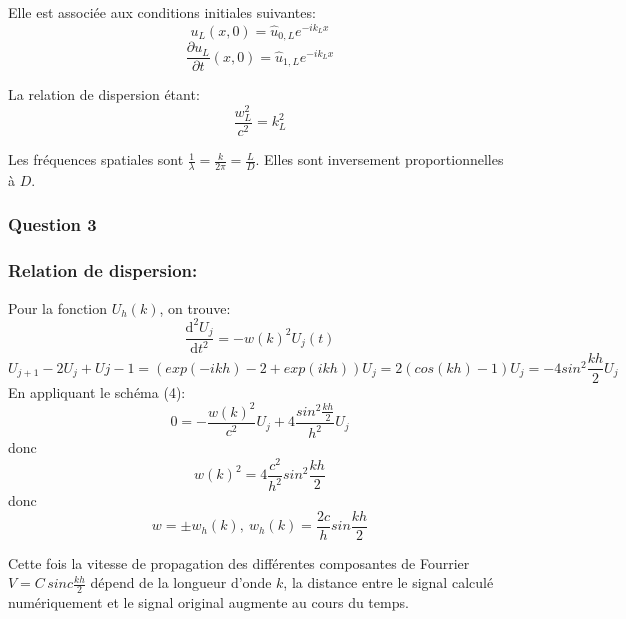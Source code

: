 \documentclass{article}
\newcommand{\Q}[1]{\subsubsection*{Question #1}}
\newcommand\Coord[2]{\ensuremath{\begin{pmatrix}
 #1 \\
 #2 
\end{pmatrix}}}
\begin{document}

 Elle est associée aux conditions initiales suivantes:
$$ u_L(x, 0) = \hat{u}_{0,L} e^{-i k_L x} $$
$$ \frac{ \partial u_L }{ \partial t }(x, 0) = \hat{u}_{1,L} e^{-i k_L x} $$

La relation de dispersion étant:
$$\frac{w_L^2}{c^2}= k_L^2$$

Les fréquences spatiales sont $ \frac{1}{ \lambda } = \frac{k}{2 \pi } = \frac{L}{D}$. Elles sont inversement proportionnelles à $D$.

\Q{3}
\subsubsection*{Relation de dispersion:} 

Pour la fonction $U_h(k)$, on trouve:
$$ \frac{\mathrm{d}^2 U_j} {\mathrm{d}t^2} = -w(k)^2 U_j(t) $$
$$ U_{j+1} - 2U_j + U{j-1} = (exp(-ikh)  - 2 + exp(ikh)) U_j = 2(cos(kh)-1) U_j = -4sin^2 \frac{kh}{2} U_j $$
En appliquant le schéma (4): 
$$ 0 = -\frac{w(k)^2}{c^2} U_j + 4\frac{sin^2 \frac{kh}{2} }{h^2} U_j$$
donc 
$$ w(k)^2 = 4\frac{c^2}{h^2}sin^2 \frac{kh}{2} $$
donc
$$ w = \pm w_h(k), \ w_h(k) = \frac{2c}{h}sin \frac{kh}{2}$$

Cette fois la vitesse de propagation des différentes composantes de Fourrier $ V = C\,sinc \frac{kh}{2}$ dépend de la longueur d'onde $k$, la distance entre le signal calculé numériquement et le signal original augmente au cours du temps.
\end{document}
